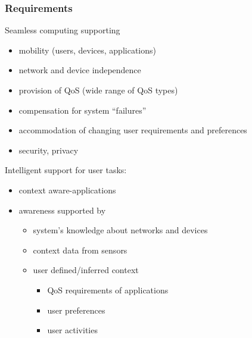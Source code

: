 \subsubsection{Requirements}
Seamless computing supporting
\begin{itemize}
	\item mobility (users, devices, applications)
	\item network and device independence
	\item provision of QoS (wide range of QoS types)
	\item compensation for system ``failures''
	\item accommodation of changing user requirements and preferences
	\item security, privacy	
\end{itemize}
Intelligent support for user tasks:
\begin{itemize}
	\item context aware-applications
	\item awareness supported by
	\begin{itemize}
		\item system's knowledge about networks and devices
		\item context data from sensors
		\item user defined/inferred context
		\begin{itemize}
			\item QoS requirements of applications
			\item user preferences
			\item user activities
		\end{itemize}
	\end{itemize}	
\end{itemize}

